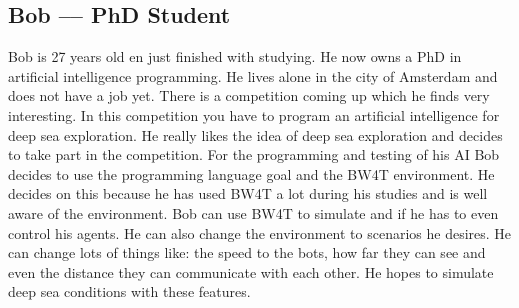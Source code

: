 \subsection{Bob –-- PhD Student}
Bob is 27 years old en just finished with studying. He now owns a PhD in artificial intelligence programming. He lives alone in the city of Amsterdam and does not have a job yet. There is a competition coming up which he finds very interesting. In this competition you have to program an artificial intelligence for deep sea exploration. He really likes the idea of deep sea exploration and decides to take part in the competition. 
For the programming and testing of his AI Bob decides to use the programming language goal and the BW4T environment. He decides on this because he has used BW4T a lot during his studies and is well aware of the environment. Bob can use BW4T to simulate and if he has to even control his agents. He can also change the environment to scenarios he desires. He can change lots of things like: the speed to the bots, how far they can see and even the distance they can communicate with each other. He hopes to simulate deep sea conditions with these features.
